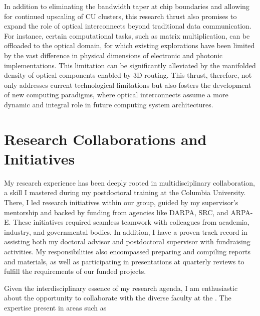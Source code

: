 In addition to eliminating the bandwidth taper at chip boundaries and allowing for continued upscaling of CU clusters, this research thrust also promises to expand the role of optical interconnects beyond traditional data communication. For instance, certain computational tasks, such as matrix multiplication, can be offloaded to the optical domain, for which existing explorations have been limited by the vast difference in physical dimensions of electronic and photonic implementations. This limitation can be significantly alleviated by the manifolded density of optical components enabled by 3D routing. This thrust, therefore, not only addresses current technological limitations but also fosters the development of new computing paradigms, where optical interconnects assume a more dynamic and integral role in future computing system architectures.



\section{Research Collaborations and Initiatives}

My research experience has been deeply rooted in multidisciplinary collaboration, a skill I mastered during my postdoctoral training at the Columbia University. There, I led research initiatives within our group, guided by my supervisor's mentorship and backed by funding from agencies like DARPA, SRC, and ARPA-E. These initiatives required seamless teamwork with colleagues from academia, industry, and governmental bodies. In addition, I have a proven track record in assisting both my doctoral advisor and postdoctoral supervisor with fundraising activities. My responsibilities also encompassed preparing and compiling reports and materials, as well as participating in presentations at quarterly reviews to fulfill the requirements of our funded projects.

Given the interdisciplinary essence of my research agenda, I am enthusiastic about the opportunity to collaborate with the diverse faculty at the \appSchool{}. The expertise present in areas such as%